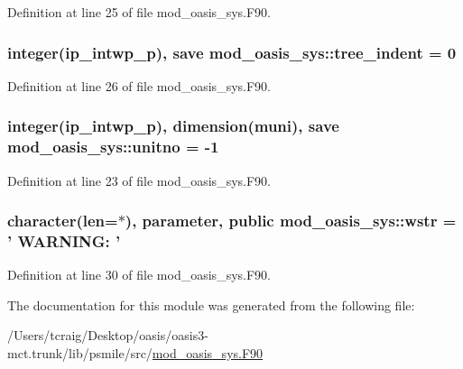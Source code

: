 Definition at line 25 of file mod\+\_\+oasis\+\_\+sys.\+F90.

\hypertarget{classmod__oasis__sys_a159b60d106efcb1f42722b08c5511ad0}{
\subsubsection[{tree\+\_\+indent}]{\setlength{\rightskip}{0pt plus 5cm}integer(ip\+\_\+intwp\+\_\+p), save mod\+\_\+oasis\+\_\+sys\+::tree\+\_\+indent = 0\hspace{0.3cm}{\ttfamily [private]}}}\label{classmod__oasis__sys_a159b60d106efcb1f42722b08c5511ad0}


Definition at line 26 of file mod\+\_\+oasis\+\_\+sys.\+F90.

\hypertarget{classmod__oasis__sys_a0fc21eee7f67c5be26a90e23d8c346db}{
\subsubsection[{unitno}]{\setlength{\rightskip}{0pt plus 5cm}integer(ip\+\_\+intwp\+\_\+p), dimension({\bf muni}), save mod\+\_\+oasis\+\_\+sys\+::unitno = -\/1\hspace{0.3cm}{\ttfamily [private]}}}\label{classmod__oasis__sys_a0fc21eee7f67c5be26a90e23d8c346db}


Definition at line 23 of file mod\+\_\+oasis\+\_\+sys.\+F90.

\hypertarget{classmod__oasis__sys_a4e16ba69c68a3a39c8b8aa3b92234ce1}{
\subsubsection[{wstr}]{\setlength{\rightskip}{0pt plus 5cm}character(len=$\ast$), parameter, public mod\+\_\+oasis\+\_\+sys\+::wstr = ' W\+A\+R\+N\+I\+N\+G\+: '}}\label{classmod__oasis__sys_a4e16ba69c68a3a39c8b8aa3b92234ce1}


Definition at line 30 of file mod\+\_\+oasis\+\_\+sys.\+F90.



The documentation for this module was generated from the following file\+:\begin{DoxyCompactItemize}
\item 
/\+Users/tcraig/\+Desktop/oasis/oasis3-\/mct.\+trunk/lib/psmile/src/\hyperlink{mod__oasis__sys_8_f90}{mod\+\_\+oasis\+\_\+sys.\+F90}\end{DoxyCompactItemize}

